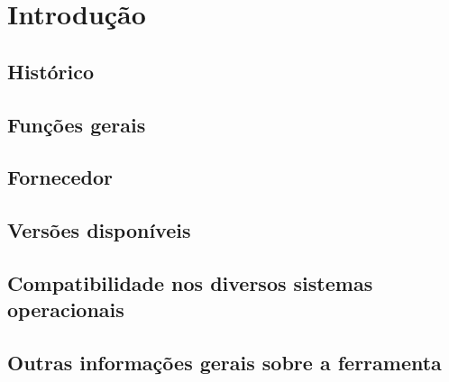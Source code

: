 \chapter[Introdução]{Introdução}

\section{Histórico}

\section{Funções gerais}

\section{Fornecedor}

\section{Versões disponíveis}

\section{Compatibilidade nos diversos sistemas operacionais}

\section{Outras informações gerais sobre a ferramenta}
